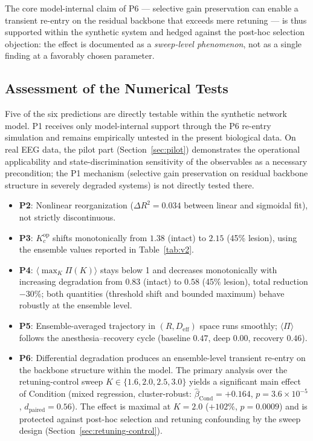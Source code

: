 ﻿\documentclass[11pt,a4paper]{article}
\theoremstyle{plain}
\theoremstyle{definition}
\theoremstyle{remark}
\begin{document}
The core model-internal claim of P6 --- selective gain preservation can enable a transient re-entry on the residual backbone that exceeds mere retuning --- is thus supported within the synthetic system and hedged against the post-hoc selection objection: the effect is documented as a \emph{sweep-level phenomenon}, not as a single finding at a favorably chosen parameter.

\subsection{Assessment of the Numerical Tests}

Five of the six predictions are directly testable within the synthetic network model. P1 receives only model-internal support through the P6 re-entry simulation and remains empirically untested in the present biological data. On real EEG data, the pilot part (Section~\ref{sec:pilot}) demonstrates the operational applicability and state-discrimination sensitivity of the observables as a necessary precondition; the P1 mechanism (selective gain preservation on residual backbone structure in severely degraded systems) is not directly tested there.

\begin{itemize}
  \item \textbf{P2}: Nonlinear reorganization ($\Delta R^2 = 0.034$ between linear and sigmoidal fit), not strictly discontinuous.
  \item \textbf{P3}: $K_c^{\mathrm{op}}$ shifts monotonically from $1.38$ (intact) to $2.15$ (45\% lesion), using the ensemble values reported in Table~\ref{tab:v2}.
  \item \textbf{P4}: $\langle\max_K \Pi(K)\rangle$ stays below 1 and decreases monotonically with increasing degradation from $0.83$ (intact) to $0.58$ (45\% lesion), total reduction $-30\%$; both quantities (threshold shift and bounded maximum) behave robustly at the ensemble level.
  \item \textbf{P5}: Ensemble-averaged trajectory in $(R, D_{\mathrm{eff}})$ space runs smoothly; $\langle \Pi \rangle$ follows the anesthesia--recovery cycle (baseline $0.47$, deep $0.00$, recovery $0.46$).
  \item \textbf{P6}: Differential degradation produces an ensemble-level transient re-entry on the backbone structure within the model. The primary analysis over the retuning-control sweep $K \in \{1.6, 2.0, 2.5, 3.0\}$ yields a significant main effect of Condition (mixed regression, cluster-robust: $\hat{\beta}_{\mathrm{Cond}} = +0.164$, $p = 3.6 \times 10^{-5}$, $d_{\mathrm{paired}} = 0.56$). The effect is maximal at $K = 2.0$ ($+102\%$, $p = 0.0009$) and is protected against post-hoc selection and retuning confounding by the sweep design (Section~\ref{sec:retuning-control}).
\end{itemize}
\end{document}
